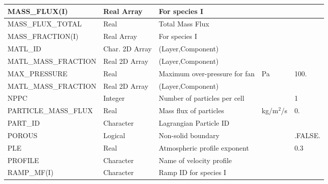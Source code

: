 \documentclass[11pt]{book}
\begin{document}
\begin{longtable}{|l|l|l|l|l|}
{\ct MASS\_FLUX(I)}                   & Real Array      & For species {\ct I}               &                     &                         \\ \hline
{\ct MASS\_FLUX\_TOTAL}               & Real            & Total Mass Flux                   &                     &                         \\ \hline
{\ct MASS\_FRACTION(I)}               & Real Array      & For species {\ct I}               &                     &                         \\ \hline
{\ct MATL\_ID}                        & Char. 2D Array  & (Layer,Component)                 &                     &                         \\ \hline
{\ct MATL\_MASS\_FRACTION}            & Real 2D Array   & (Layer,Component)                 &                     &                         \\ \hline
{\ct MAX\_PRESSURE }                  & Real            & Maximum over-pressure for fan     & Pa                  & 100.                    \\ \hline
{\ct MATL\_MASS\_FRACTION}            & Real 2D Array   & (Layer,Component)                 &                     &                         \\ \hline
{\ct NPPC}                            & Integer         & Number of particles per cell      &                     & 1                       \\ \hline
{\ct PARTICLE\_MASS\_FLUX}            & Real            & Mass flux of particles            & kg/m$^2$/s          & 0.                      \\ \hline
{\ct PART\_ID}                        & Character       & Lagrangian Particle ID            &                     &                         \\ \hline
{\ct POROUS}                          & Logical         & Non-solid boundary                &                     & {\ct .FALSE.}           \\ \hline
{\ct PLE}                             & Real            & Atmospheric profile exponent      &                     & 0.3                     \\ \hline
{\ct PROFILE}                         & Character       & Name of velocity profile          &                     &                         \\ \hline
{\ct RAMP\_MF(I)}                     & Character       & Ramp ID for species I             &                     &                         \\ \hline

\end{longtable}
\end{document}

